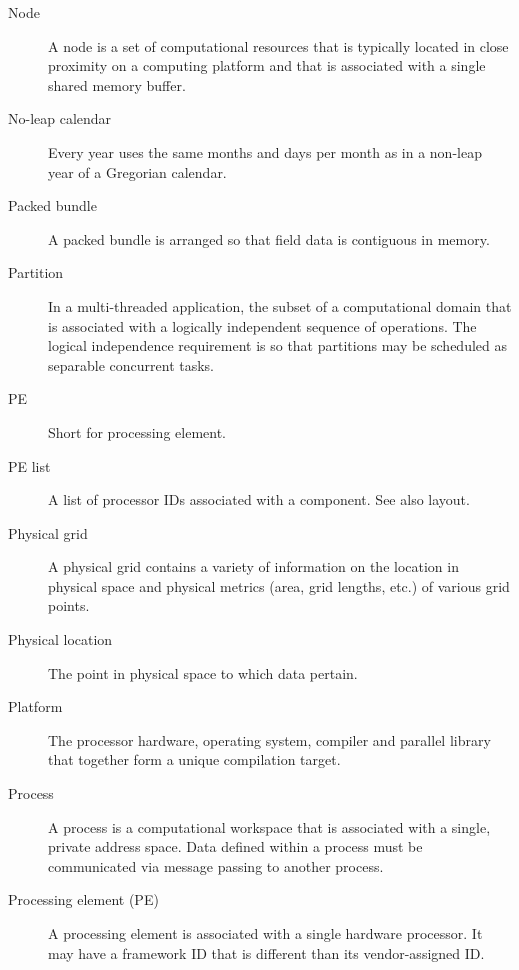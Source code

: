 \begin{description}
\item[Node] \label{glos:Node} A node is a set of computational resources
  that is typically located in close proximity on a computing platform
  and that is associated with a single shared memory buffer.

\item [No-leap calendar] \label{glos:NoLeap} Every year uses the same months 
and days per month as in a non-leap year of a Gregorian calendar.

\item[Packed bundle] \label{glos:PackedBundle} A packed bundle is arranged
  so that field data is contiguous in memory.

\item[Partition] \label{glos:Partition} In a multi-threaded application, the subset of a
  computational domain that is associated with a logically independent
  sequence of operations. The logical independence requirement is so
  that partitions may be scheduled as separable concurrent tasks.

\item[PE] \label{glos:PE} Short for processing element.

\item[PE list] \label{glos:PElist} A list of processor IDs associated 
  with a component.  See also layout.

\item[Physical grid] \label{term:PhysGrid} 
  A physical grid contains a variety of information
  on the location in physical space and physical metrics (area,
  grid lengths, etc.) of various grid points.

\item[Physical location] \label{glos:PhysLoc} The point in physical space 
  to which data pertain. 

\item[Platform] \label{glos:Platform} 
  The processor hardware, operating system, compiler and
  parallel library that together form a unique compilation target.

\item[Process] \label{glos:Process}
  A process is a computational workspace that is associated with a single,
  private address space.  Data defined within a process must be communicated
  via message passing to another process.

\item[Processing element (PE)] \label{glos:Processing_Element}
A processing element is associated with a single hardware processor.  It may
have a framework ID that is different than its vendor-assigned ID.  


\end{description}
